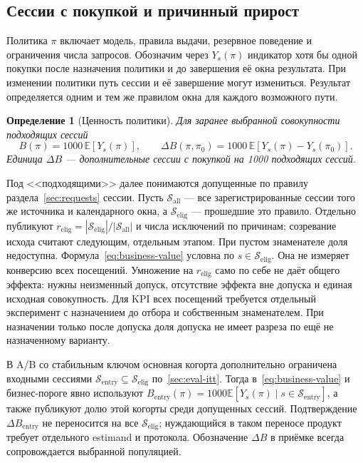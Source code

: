\documentclass[12pt,a4paper]{article}
\newcommand{\E}{\mathbb E}
\theoremstyle{plainru}
\newtheorem{definition}{Определение}[section]
\begin{document}
\subsection{Сессии с покупкой и причинный прирост}

Политика \(\pi\) включает модель, правила выдачи, резервное поведение
и ограничения числа запросов. Обозначим через \(Y_s(\pi)\)
индикатор хотя бы одной покупки после назначения политики
и до завершения её окна результата. При изменении политики
путь сессии и её завершение могут измениться. Результат определяется
одним и тем же правилом окна для каждого возможного пути.

\begin{definition}[Ценность политики]
Для заранее выбранной совокупности подходящих сессий
\begin{equation}\label{eq:business-value}
B(\pi)=1000\,\E[Y_s(\pi)],\qquad
\Delta B(\pi,\pi_0)=1000\,\E[Y_s(\pi)-Y_s(\pi_0)].
\end{equation}
Единица \(\Delta B\) --- дополнительные сессии с покупкой
на 1000 подходящих сессий.
\end{definition}

Под <<подходящими>> далее понимаются допущенные по правилу
раздела~\ref{sec:requests} сессии. Пусть $\mathcal S_{\mathrm{all}}$
--- все зарегистрированные сессии того же источника и календарного окна,
а $\mathcal S_{\mathrm{elig}}$ --- прошедшие это правило. Отдельно публикуют
$r_{\mathrm{elig}}=|\mathcal S_{\mathrm{elig}}|/|\mathcal S_{\mathrm{all}}|$
и числа исключений по причинам; созревание исхода считают следующим,
отдельным этапом. При пустом знаменателе доля недоступна.
Формула~\eqref{eq:business-value} условна по $s\in\mathcal S_{\mathrm{elig}}$.
Она не измеряет конверсию всех посещений. Умножение на $r_{\mathrm{elig}}$
само по себе не даёт общего эффекта: нужны неизменный допуск, отсутствие
эффекта вне допуска и единая исходная совокупность. Для KPI всех посещений
требуется отдельный эксперимент с назначением до отбора и собственным
знаменателем. При назначении только после допуска доля допуска не имеет
разреза по ещё не назначенному варианту.

В A/B со стабильным ключом основная когорта дополнительно ограничена
входными сессиями $\mathcal S_{\mathrm{entry}}\subseteq\mathcal S_{\mathrm{elig}}$
по~\ref{sec:eval-itt}. Тогда в~\eqref{eq:business-value} и бизнес-пороге
явно используют $B_{\mathrm{entry}}(\pi)=1000\E[Y_s(\pi)\mid
s\in\mathcal S_{\mathrm{entry}}]$, а также публикуют долю этой когорты
среди допущенных сессий. Подтверждение $\Delta B_{\mathrm{entry}}$
не переносится на все $\mathcal S_{\mathrm{elig}}$; нуждающийся в таком
переносе продукт требует отдельного estimand и протокола. Обозначение
$\Delta B$ в приёмке всегда сопровождается выбранной популяцией.
\end{document}
